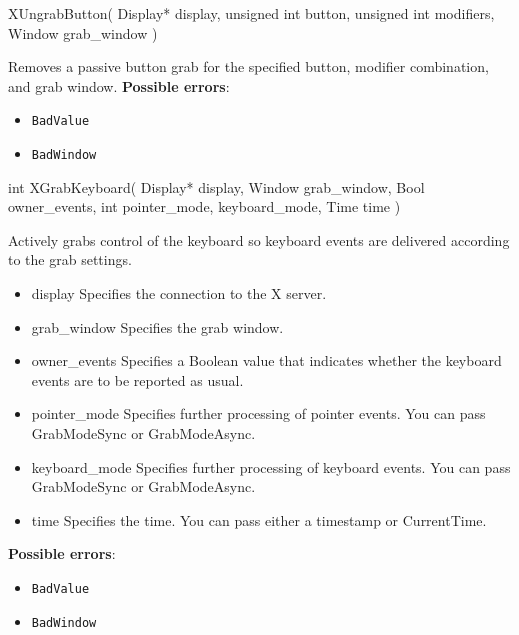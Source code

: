 \documentclass{report}
\begin{document}
\begin{itemize}
        \begin{cppcode}
        XUngrabButton(
            Display* display,
            unsigned int button,
            unsigned int modifiers,
            Window grab_window
        )
        \end{cppcode}
        \bigbreak \noindent
        Removes a passive button grab for the specified button, modifier combination, and grab window.
        \textbf{Possible errors}:
        \begin{itemize}
            \item \texttt{BadValue}
            \item \texttt{BadWindow}
        \end{itemize}

        \begin{cppcode}
            int XGrabKeyboard(
                Display* display,
                Window grab_window,
                Bool owner_events,
                int pointer_mode, keyboard_mode,
                Time time
            )
        \end{cppcode}
        \bigbreak \noindent
        Actively grabs control of the keyboard so keyboard events are delivered according to the grab settings.

        \begin{itemize}
            \item display Specifies the connection to the X server.
            \item grab\_window Specifies the grab window.
            \item owner\_events Specifies a Boolean value that indicates whether the keyboard events are to be reported as usual.
            \item pointer\_mode Specifies further processing of pointer events. You can pass GrabModeSync or GrabModeAsync.
            \item keyboard\_mode Specifies further processing of keyboard events. You can pass GrabModeSync or GrabModeAsync.
            \item time Specifies the time. You can pass either a timestamp or CurrentTime.
        \end{itemize}

        \textbf{Possible errors}:
        \begin{itemize}
            \item \texttt{BadValue}
            \item \texttt{BadWindow}
        \end{itemize}


\end{itemize}
\end{document}
